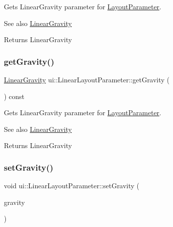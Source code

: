 Gets Linear\+Gravity parameter for \hyperlink{classui_1_1LayoutParameter}{Layout\+Parameter}.

\begin{DoxySeeAlso}{See also}
\hyperlink{classui_1_1LinearLayoutParameter_a2045fd6c06860357e95bccdf2531fe08}{Linear\+Gravity} 
\end{DoxySeeAlso}
\begin{DoxyReturn}{Returns}
Linear\+Gravity 
\end{DoxyReturn}
\mbox{\label{classui_1_1LinearLayoutParameter_aff9a9ddafe0ba86fb4f196c710d18d98}} 
\subsubsection{\texorpdfstring{get\+Gravity()}{getGravity()}\hspace{0.1cm}{\footnotesize\ttfamily [2/2]}}
{\footnotesize\ttfamily \hyperlink{classui_1_1LinearLayoutParameter_a2045fd6c06860357e95bccdf2531fe08}{Linear\+Gravity} ui\+::\+Linear\+Layout\+Parameter\+::get\+Gravity (\begin{DoxyParamCaption}{ }\end{DoxyParamCaption}) const}

Gets Linear\+Gravity parameter for \hyperlink{classui_1_1LayoutParameter}{Layout\+Parameter}.

\begin{DoxySeeAlso}{See also}
\hyperlink{classui_1_1LinearLayoutParameter_a2045fd6c06860357e95bccdf2531fe08}{Linear\+Gravity} 
\end{DoxySeeAlso}
\begin{DoxyReturn}{Returns}
Linear\+Gravity 
\end{DoxyReturn}
\mbox{\label{classui_1_1LinearLayoutParameter_a5ff8462b69c4e25041cef73621ddc963}} 
\subsubsection{\texorpdfstring{set\+Gravity()}{setGravity()}\hspace{0.1cm}{\footnotesize\ttfamily [1/2]}}
{\footnotesize\ttfamily void ui\+::\+Linear\+Layout\+Parameter\+::set\+Gravity (\begin{DoxyParamCaption}\item[{\hyperlink{classui_1_1LinearLayoutParameter_a2045fd6c06860357e95bccdf2531fe08}{Linear\+Gravity}}]{gravity }\end{DoxyParamCaption})}

